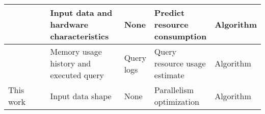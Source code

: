 \begin{table}[ht]
{\begin{tabular}{@{}|p{0.11\linewidth}|p{0.3\linewidth}|p{0.5\linewidth}|p{0.3\linewidth}|p{0.3\linewidth}|p{0.2\linewidth}|@{}}
      \cite{duplyakin2018} &                                      & Input data and hardware characteristics                      & None                                     & Predict resource consumption   & Algorithm            \\ \midrule
      \cite{tang2021}      &                                      & Memory usage history and executed query                      & Query logs                               & Query resource usage estimate  & Algorithm            \\ \midrule
      This work            &                                      & Input data shape                                             & None                                     & Parallelism optimization       & Algorithm            \\ \midrule
    \end{tabular}
  }
\end{table}
